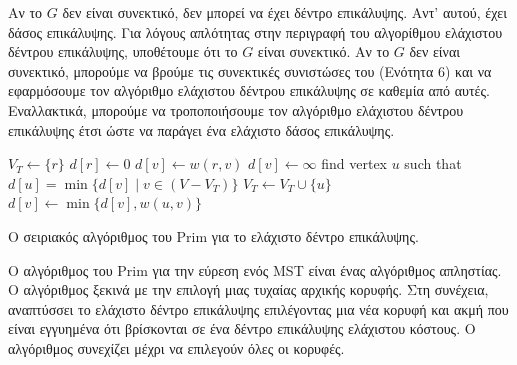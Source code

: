 \documentclass[12pt,a4paper]{article}
\begin{document}
Αν το $G$ δεν είναι συνεκτικό, δεν μπορεί να έχει δέντρο επικάλυψης. Αντ’ αυτού, έχει δάσος επικάλυψης. Για λόγους απλότητας στην περιγραφή του αλγορίθμου ελάχιστου δέντρου επικάλυψης, υποθέτουμε ότι το $G$ είναι συνεκτικό. Αν το $G$ δεν είναι συνεκτικό, μπορούμε να βρούμε τις συνεκτικές συνιστώσες του (Ενότητα 6) και να εφαρμόσουμε τον αλγόριθμο ελάχιστου δέντρου επικάλυψης σε καθεμία από αυτές. Εναλλακτικά, μπορούμε να τροποποιήσουμε τον αλγόριθμο ελάχιστου δέντρου επικάλυψης έτσι ώστε να παράγει ένα ελάχιστο δάσος επικάλυψης.


\begin{algorithm}[H]
\begin{algorithmic}[1]
    \State $V_T \gets \{r\}$
    \State $d[r] \gets 0$
            \State $d[v] \gets w(r, v)$
        \Else
            \State $d[v] \gets \infty$
        \EndIf
    \EndFor
        \State find vertex $u$ such that $d[u] = \min\{d[v] \mid v \in (V - V_T)\}$
        \State $V_T \gets V_T \cup \{u\}$
            \State $d[v] \gets \min\{d[v], w(u, v)\}$
        \EndFor
    \EndWhile
\EndProcedure
\end{algorithmic}
\end{algorithm}


{\raggedright{} Ο σειριακός αλγόριθμος του \foreignlanguage{english}{Prim} για το ελάχιστο δέντρο επικάλυψης.\label{alg:prim}\par}



\vspace{1cm}
Ο αλγόριθμος του \foreignlanguage{english}{Prim} για την εύρεση ενός \foreignlanguage{english}{MST} είναι ένας αλγόριθμος απληστίας. Ο αλγόριθμος ξεκινά με την επιλογή μιας τυχαίας αρχικής κορυφής. Στη συνέχεια, αναπτύσσει το ελάχιστο δέντρο επικάλυψης επιλέγοντας μια νέα κορυφή και ακμή που είναι εγγυημένα ότι βρίσκονται σε ένα δέντρο επικάλυψης ελάχιστου κόστους. Ο αλγόριθμος συνεχίζει μέχρι να επιλεγούν όλες οι κορυφές.
\end{document}
